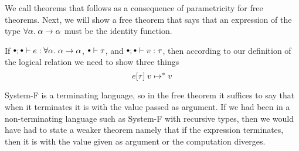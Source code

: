 We call theorems that follows as a consequence of parametricity for free theorems. Next, we will show a free theorem that says that an expression of the type $\forall \alpha. \;  \alpha \rightarrow \alpha$ must be the identity function.

\begin{theorem} If $\mtenv; \mtenv \vdash e : \forall \alpha.\; \tarrow{\alpha}{\alpha}$, $\mtenv \vdash \tau$, and $\mtenv; \mtenv \vdash v : \tau$, then according to our definition of the logical relation we need to show three things
\[
  e[\tau] \; v \mapsto^{*} v
\]
\end{theorem}
System-F is a terminating language, so in the free theorem it suffices to say that when it terminates it is with the value passed as argument. If we had been in a non-terminating language such as System-F with recursive types, then we would have had to state a weaker theorem namely that if the expression terminates, then it is with the value given as argument or the computation diverges.
